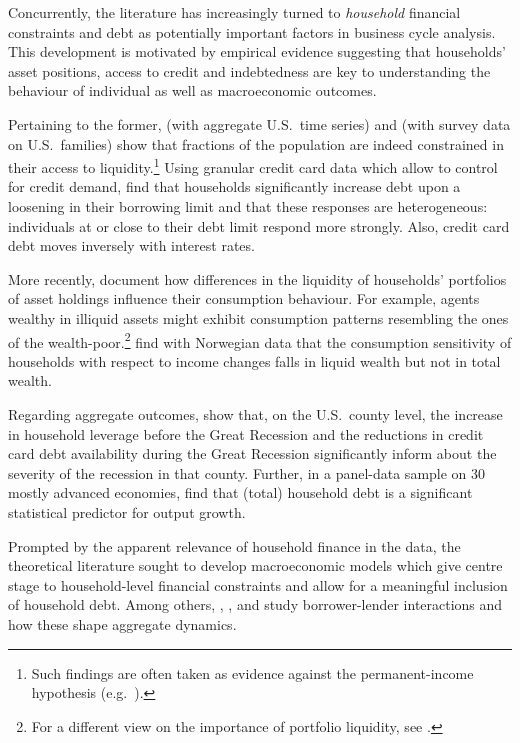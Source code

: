 \documentclass[a4paper,12pt]{article} %
\numberwithin{equation}{section} %
\numberwithin{figure}{section}
\numberwithin{table}{section}
\begin{document}
Concurrently, the literature has increasingly turned to \textit{household} financial constraints and debt as potentially important factors in business cycle analysis. This development is motivated by empirical evidence suggesting that households' asset positions, access to credit and indebtedness are key to understanding the behaviour of individual as well as macroeconomic outcomes. 

Pertaining to the former, \textcite{campbell1989} (with aggregate U.S.~time series) and \textcite{zeldes1989} (with survey data on U.S.~families) show that fractions of the population are indeed constrained in their access to liquidity.\footnote{Such findings are often taken as evidence against the permanent-income hypothesis (e.g.~\cite{kaplan2014}).} Using granular credit card data which allow to control for credit demand, \textcite{gross2002} find that households significantly increase debt upon a loosening in their borrowing limit and that these responses are heterogeneous: individuals at or close to their debt limit respond more strongly. Also, credit card debt moves inversely with interest rates. 

More recently, \textcite{kaplan2014} document how differences in the liquidity of households' portfolios of asset holdings influence their consumption behaviour. For example, agents wealthy in illiquid assets might exhibit consumption patterns resembling the ones of the wealth-poor.\footnote{For a different view on the importance of portfolio liquidity, see \textcite{aguiar2020}.} \textcite{fagereng2021mpc} find with Norwegian data that the consumption sensitivity of households with respect to income changes falls in liquid wealth but not in total wealth.

Regarding aggregate outcomes, \textcite{mian2010} show that, on the U.S.~county level, the increase in household leverage before the Great Recession and the reductions in credit card debt availability during the Great Recession significantly inform about the severity of the recession in that county. Further, in a panel-data sample on 30 mostly advanced economies, \textcite{mian2017} find that (total) household debt is a significant statistical predictor for output growth.

Prompted by the apparent relevance of household finance in the data, the theoretical literature sought to develop macroeconomic models which give centre stage to household-level financial constraints and allow for a meaningful inclusion of household debt. Among others, \textcite{egg2012}, \textcite{riosrull2015}, \textcite{justiniano2015} and \textcite{gl2017} study borrower-lender interactions and how these shape aggregate dynamics.
\end{document}
